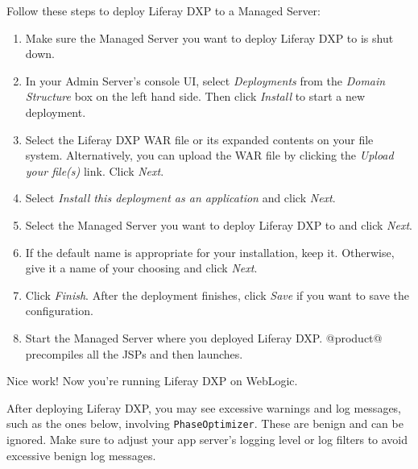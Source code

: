 Follow these steps to deploy Liferay DXP to a Managed Server:

\begin{enumerate}
\def\labelenumi{\arabic{enumi}.}
\item
  Make sure the Managed Server you want to deploy Liferay DXP to is shut
  down.
\item
  In your Admin Server's console UI, select \emph{Deployments} from the
  \emph{Domain Structure} box on the left hand side. Then click
  \emph{Install} to start a new deployment.
\item
  Select the Liferay DXP WAR file or its expanded contents on your file
  system. Alternatively, you can upload the WAR file by clicking the
  \emph{Upload your file(s)} link. Click \emph{Next}.
\item
  Select \emph{Install this deployment as an application} and click
  \emph{Next}.
\item
  Select the Managed Server you want to deploy Liferay DXP to and click
  \emph{Next}.
\item
  If the default name is appropriate for your installation, keep it.
  Otherwise, give it a name of your choosing and click \emph{Next}.
\item
  Click \emph{Finish}. After the deployment finishes, click \emph{Save}
  if you want to save the configuration.
\item
  Start the Managed Server where you deployed Liferay DXP. @product@
  precompiles all the JSPs and then launches.
\end{enumerate}

Nice work! Now you're running Liferay DXP on WebLogic.

\noindent\hrulefill

After deploying Liferay DXP, you may see excessive warnings and log
messages, such as the ones below, involving \texttt{PhaseOptimizer}.
These are benign and can be ignored. Make sure to adjust your app
server's logging level or log filters to avoid excessive benign log
messages.

